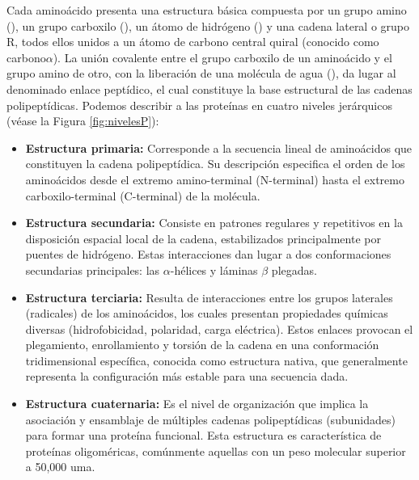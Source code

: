 Cada amino\'{a}cido presenta una estructura b\'{a}sica compuesta por un grupo amino (), un grupo carboxilo (), un \'{a}tomo de hidr\'{o}geno () y una cadena lateral o grupo R, todos ellos unidos a un \'{a}tomo de carbono central quiral (conocido como carbono$\alpha$). La uni\'{o}n covalente entre el grupo carboxilo de un amino\'{a}cido y el grupo amino de otro, con la liberaci\'{o}n de una mol\'{e}cula de agua (), da lugar al denominado enlace pept\'{i}dico, el cual constituye la base estructural de las cadenas polipept\'{i}dicas. Podemos describir a las prote\'{i}nas en cuatro niveles jer\'{a}rquicos (v\'{e}ase la Figura \ref{fig:nivelesP}):

\begin{itemize}


	\item \textbf{Estructura primaria:} Corresponde a la secuencia lineal de amino\'{a}cidos que constituyen la cadena polipept\'{i}dica. Su descripci\'{o}n especifica el orden de los amino\'{a}cidos desde el extremo amino-terminal (N-terminal) hasta el extremo carboxilo-terminal (C-terminal) de la mol\'{e}cula.
	
	\item \textbf{Estructura secundaria:} Consiste en patrones regulares y repetitivos en la disposici\'{o}n espacial local de la cadena, estabilizados principalmente por puentes de hidr\'{o}geno. Estas interacciones dan lugar a dos conformaciones secundarias principales: las $\alpha$-h\'{e}lices y l\'{a}minas $\beta$ plegadas.
	
	\item \textbf{Estructura terciaria:} Resulta de interacciones entre los grupos laterales (radicales) de los amino\'{a}cidos, los cuales presentan propiedades qu\'{i}micas diversas (hidrofobicidad, polaridad, carga el\'{e}ctrica). Estos enlaces provocan el plegamiento, enrollamiento y torsi\'{o}n de la cadena en una conformaci\'{o}n tridimensional espec\'{i}fica, conocida como estructura nativa, que generalmente representa la configuraci\'{o}n m\'{a}s estable para una secuencia dada.
	
	\item \textbf{Estructura cuaternaria:} Es el nivel de organizaci\'{o}n que implica la asociaci\'{o}n y ensamblaje de m\'{u}ltiples cadenas polipept\'{i}dicas (subunidades) para formar una prote\'{i}na funcional. Esta estructura es caracter\'{i}stica de prote\'{i}nas oligom\'{e}ricas, com\'{u}nmente aquellas con un peso molecular superior a 50,000 uma.
\end{itemize}

